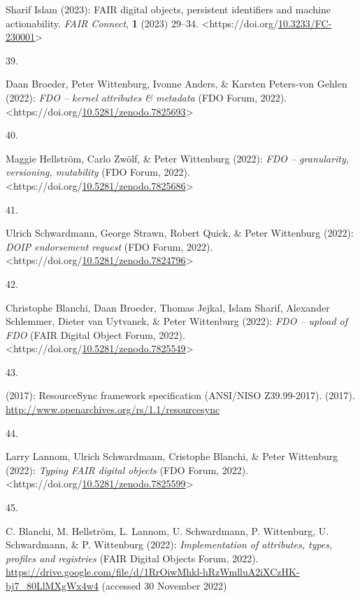 \begin{thebibliography}{9}
Sharif Islam (2023): {FAIR} digital objects, persistent identifiers and
machine actionability. \emph{FAIR Connect}, \textbf{1} (2023) 29--34.
\textless https://doi.org/\href{https://doi.org/10.3233/FC-230001}{10.3233/FC-230001}\textgreater{}

\hypertarget{ref-fdo-KernelAttributes}{}
39.

Daan Broeder, Peter Wittenburg, Ivonne Anders, \& Karsten Peters-von
Gehlen (2022): \emph{{FDO} -- kernel attributes \& metadata} ({FDO
Forum}, 2022).
\textless https://doi.org/\href{https://doi.org/10.5281/zenodo.7825693}{10.5281/zenodo.7825693}\textgreater{}

\hypertarget{ref-fdo-Granularity}{}
40.

Maggie Hellström, Carlo Zwölf, \& Peter Wittenburg (2022): \emph{{FDO}
-- granularity, versioning, mutability} ({FDO Forum}, 2022).
\textless https://doi.org/\href{https://doi.org/10.5281/zenodo.7825686}{10.5281/zenodo.7825686}\textgreater{}

\hypertarget{ref-fdo-DOIPEndorsement}{}
41.

Ulrich Schwardmann, George Strawn, Robert Quick, \& Peter Wittenburg
(2022): \emph{{DOIP} endorsement request} ({FDO Forum}, 2022).
\textless https://doi.org/\href{https://doi.org/10.5281/zenodo.7824796}{10.5281/zenodo.7824796}\textgreater{}

\hypertarget{ref-fdo-FDO-Upload}{}
42.

Christophe Blanchi, Daan Broeder, Thomas Jejkal, Islam Sharif, Alexander
Schlemmer, Dieter van Uytvanck, \& Peter Wittenburg (2022): \emph{{FDO}
-- upload of {FDO}} ({FAIR Digital Object Forum}, 2022).
\textless https://doi.org/\href{https://doi.org/10.5281/zenodo.7825549}{10.5281/zenodo.7825549}\textgreater{}

\hypertarget{ref-ResourceSyncFrameworkSpecification}{}
43.

(2017): {ResourceSync} framework specification ({ANSI/NISO
Z39.99-2017}). (2017).
\url{http://www.openarchives.org/rs/1.1/resourcesync}

\hypertarget{ref-fdo-TypingFDOs}{}
44.

Larry Lannom, Ulrich Schwardmann, Cristophe Blanchi, \& Peter Wittenburg
(2022): \emph{Typing {FAIR} digital objects} ({FDO Forum}, 2022).
\textless https://doi.org/\href{https://doi.org/10.5281/zenodo.7825599}{10.5281/zenodo.7825599}\textgreater{}

\hypertarget{ref-fdo-ImplAttributesTypesProfiles}{}
45.

C. Blanchi, M. Hellström, L. Lannom, U. Schwardmann, P. Wittenburg, U.
Schwardmann, \& P. Wittenburg (2022): \emph{Implementation of
attributes, types, profiles and registries} ({FAIR Digital Objects
Forum}, 2022).
\url{https://drive.google.com/file/d/1RrOiwMhkl-hRzWmlluA2iXCzHK-bj7_80LlMXgWx4w4}
(accessed 30 November 2022)


\end{thebibliography}
